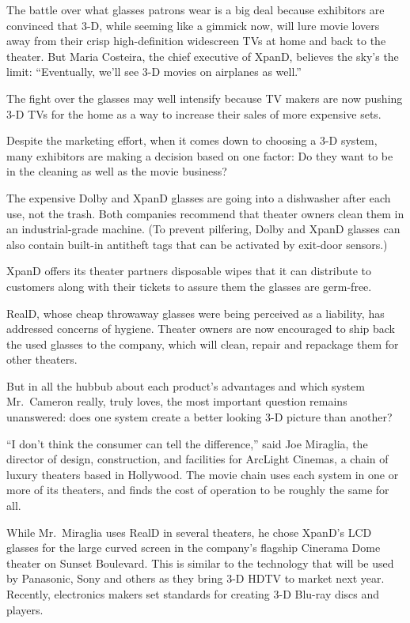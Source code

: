 ﻿\documentclass[12pt]{article}
\begin{document}
The battle over what glasses patrons wear is a big deal because exhibitors are convinced that 3-D,
while seeming like a gimmick now, will lure movie lovers away from their crisp high-definition
widescreen TVs at home and back to the theater. But Maria Costeira, the chief executive of XpanD,
believes the sky's the limit: ``Eventually, we'll see 3-D movies on airplanes as well.''

The fight over the glasses may well intensify because TV makers are now pushing 3-D TVs for the home
as a way to increase their sales of more expensive sets.

Despite the marketing effort, when it comes down to choosing a 3-D system, many exhibitors are
making a decision based on one factor: Do they want to be in the cleaning as well as the movie
business?

The expensive Dolby and XpanD glasses are going into a dishwasher after each use, not the trash.
Both companies recommend that theater owners clean them in an industrial-grade machine. (To prevent
pilfering, Dolby and XpanD glasses can also contain built-in antitheft tags that can be activated by
exit-door sensors.)

XpanD offers its theater partners disposable wipes that it can distribute to customers along with
their tickets to assure them the glasses are germ-free.

RealD, whose cheap throwaway glasses were being perceived as a liability, has addressed concerns of
hygiene. Theater owners are now encouraged to ship back the used glasses to the company, which will
clean, repair and repackage them for other theaters.

But in all the hubbub about each product's advantages and which system Mr.~Cameron really, truly
loves, the most important question remains unanswered: does one system create a better looking 3-D
picture than another?

``I don't think the consumer can tell the difference,'' said Joe Miraglia, the director of design,
construction, and facilities for ArcLight Cinemas, a chain of luxury theaters based in Hollywood.
The movie chain uses each system in one or more of its theaters, and finds the cost of operation to
be roughly the same for all.

While Mr.~Miraglia uses RealD in several theaters, he chose XpanD's LCD glasses for the large curved
screen in the company's flagship Cinerama Dome theater on Sunset Boulevard. This is similar to the
technology that will be used by Panasonic, Sony and others as they bring 3-D HDTV to market next
year. Recently, electronics makers set standards for creating 3-D Blu-ray discs and players.
\end{document}
